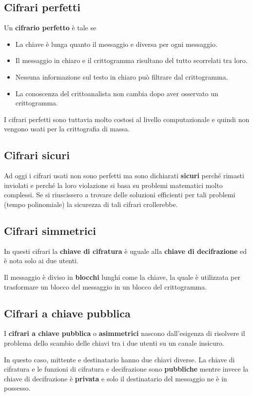\subsection{Cifrari perfetti}
Un \textbf{cifrario perfetto} \`e tale se
\begin{itemize}
	\item La chiave \`e lunga quanto il messaggio e diversa per ogni messaggio.
	\item Il messaggio in chiaro e il crittogramma risultano del tutto scorrelati tra loro.
	\item Nessuna informazione sul testo in chiaro pu\`o filtrare dal crittogramma.
	\item La conoscenza del crittoanalista non cambia dopo aver osservato un crittogramma.
\end{itemize}
I cifrari perfetti sono tuttavia molto costosi al livello computazionale e quindi non vengono usati per la crittografia
di massa.

\subsection{Cifrari sicuri}
Ad oggi i cifrari usati non sono perfetti ma sono dichiarati \textbf{sicuri} perch\'e rimasti inviolati e perch\'e la
loro violazione si basa su problemi matematici molto complessi. Se si riuscissero a trovare delle soluzioni efficienti
per tali problemi (tempo polinomiale) la sicurezza di tali cifrari crollerebbe.

\subsection{Cifrari simmetrici}
In questi cifrari la \textbf{chiave di cifratura} \`e uguale alla \textbf{chiave di decifrazione} ed \`e nota solo ai
due utenti.

Il messaggio \`e diviso in \textbf{blocchi} lunghi come la chiave, la quale \`e utilizzata per trasformare un blocco
del messaggio in un blocco del crittogramma.

\subsection{Cifrari a chiave pubblica}
I \textbf{cifrari a chiave pubblica} o \textbf{asimmetrici} nascono dall'esigenza di risolvere il problema dello scambio
delle chiavi tra i due utenti su un canale insicuro.

In questo caso, mittente e destinatario hanno due chiavi diverse. La chiave di cifratura e le funzioni di cifratura e
decifrazione sono \textbf{pubbliche} mentre invece la chiave di decifrazione \`e \textbf{privata} e solo il destinatario
del messaggio ne \`e in possesso.

